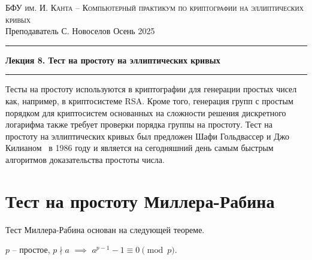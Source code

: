 \documentclass[11pt]{exam}
\theoremstyle{definition}
\newcommand*{\structure}[1]{\textcolor{struct-color}{#1}}
\begin{document}
{\noindent
\textsc{БФУ им. И. Канта -- Компьютерный практикум по криптографии на эллиптических кривых }\\[5pt]
Преподаватель {С. Новоселов}   \hfill{Осень 2025\\}
\hrule
\begin{center}
	{\LARGE\textbf{
			Лекция 8. Тест на простоту на эллиптических кривых \\[5pt]
		}}

\end{center}
\hrule \vspace{5mm}

\thispagestyle{empty}

Тесты на простоту используются в криптографии для генерации простых чисел как, например, в криптосистеме RSA. Кроме того, генерация групп с простым порядком для криптосистем основанных на сложности решения дискретного логарифма также требует проверки порядка группы на простоту. Тест на простоту на эллиптических кривых был предложен  Шафи Гольдвассер и Джо Килианом~\cite{GoldwasserKilian1999} в 1986 году и является на сегодняшний день самым быстрым алгоритмов доказательства простоты числа.

\section{Тест на простоту Миллера-Рабина}
Тест Миллера-Рабина основан на следующей теореме.

\begin{center}
	\begin{tcolorbox}[enhanced,hbox,colback=title-and-section-color!5,colframe=title-and-section-color!120,title=Малая теорема Ферма,center title]
		\begin{varwidth}{\textwidth}
			\begin{center}
				$p$ -- простое, $p \nmid a$ \structure{$\implies$} $a^{p-1} - 1 \equiv 0 \pmod{p}$.
			\end{center}
		\end{varwidth}
	\end{tcolorbox}
\end{center}

}
\end{document}
